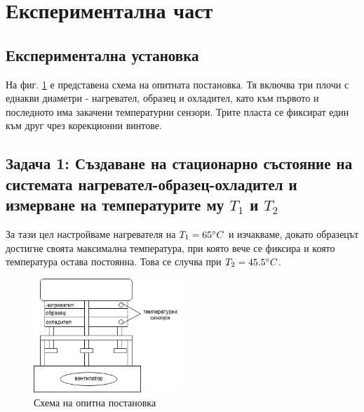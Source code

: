 \documentclass[12pt]{article}
\begin{document}
\section{Експериментална част}

\subsection{Експериментална установка} 
На фиг. \ref{fig:setup} е представена схема на опитната постановка. Тя включва три плочи с еднакви диаметри - нагревател, образец и охладител, като към първото и последното има закачени температурни сензори. Трите пласта се фиксират един към друг чрез корекционни винтове. 

\subsection{Задача 1: Създаване на стационарно състояние на системата нагревател-образец-охладител и измерване на температурите му $T_1$ и $T_2$}

За тази цел настройваме нагревателя на $T_1 = 65 \degree C$ и изчакваме, докато образецът достигне своята максимална температура, при която вече се фиксира и която температура остава постоянна. Това се случва при $T_2 = 45.5 \degree C$.
\begin{figure}
    \centering
    \includegraphics[width=0.5\textwidth]{images/thermal-conductivity-cooling-setup.drawio.png}
    \caption{\label{fig:setup}Схема на опитна постановка}
    \label{fig:setup}
\end{figure}
\end{document}
